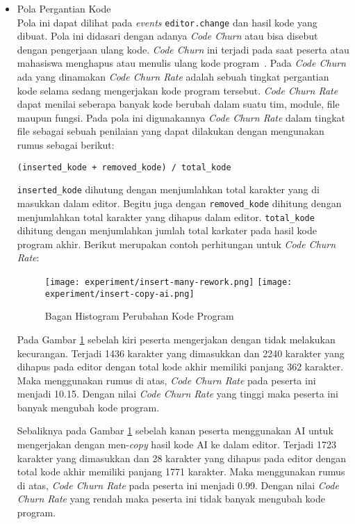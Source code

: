 \begin{itemize}
    \item Pola Pergantian Kode \\
    Pola ini dapat dilihat pada \textit{events} \verb|editor.change| dan hasil kode yang dibuat. Pola ini didasari dengan adanya \textit{Code Churn} atau bisa disebut dengan pengerjaan ulang kode. \textit{Code Churn} ini terjadi pada saat peserta atau mahasiswa menghapus atau menulis ulang kode program~\cite{hatica:churn}. Pada \textit{Code Churn} ada yang dinamakan \textit{Code Churn Rate} adalah sebuah tingkat pergantian kode selama sedang mengerjakan kode program tersebut. \textit{Code Churn Rate} dapat menilai seberapa banyak kode berubah dalam suatu tim, module, file maupun fungsi. Pada pola ini digunakannya \textit{Code Churn Rate} dalam tingkat file sebagai sebuah penilaian yang dapat dilakukan dengan mengunakan rumus sebagai berikut:
    
    \begin{center}
        \verb|(inserted_kode + removed_kode) / total_kode|
    \end{center}

    \verb|inserted_kode| dihutung dengan menjumlahkan total karakter yang di masukkan dalam editor. Begitu juga dengan \verb|removed_kode| dihitung dengan menjumlahkan total karakter yang dihapus dalam editor. \verb|total_kode| dihitung dengan menjumlahkan jumlah total karkater pada hasil kode program akhir. Berikut merupakan contoh perhitungan untuk \textit{Code Churn Rate}:

    \begin{figure}[H]
        \centering
        \texttt{[image: experiment/insert-many-rework.png]}
        \texttt{[image: experiment/insert-copy-ai.png]}
        \caption{Bagan Histogram Perubahan Kode Program}
        \label{fig:5:2:3:rework}
    \end{figure}

    Pada Gambar \ref{fig:5:2:3:rework} sebelah kiri peserta mengerjakan dengan tidak melakukan kecurangan. Terjadi 1436 karakter yang dimasukkan dan 2240 karakter yang dihapus pada editor dengan total kode akhir memiliki panjang 362 karakter. Maka menggunakan rumus di atas, \textit{Code Churn Rate} pada peserta ini menjadi 10.15. Dengan nilai \textit{Code Churn Rate} yang tinggi maka peserta ini banyak mengubah kode program.
    
    Sebaliknya pada Gambar \ref{fig:5:2:3:rework} sebelah kanan peserta menggunakan AI untuk mengerjakan dengan men-\textit{copy} hasil kode AI ke dalam editor. Terjadi 1723 karakter yang dimasukkan dan 28 karakter yang dihapus pada editor dengan total kode akhir memiliki panjang 1771 karakter. Maka menggunakan rumus di atas, \textit{Code Churn Rate} pada peserta ini menjadi 0.99. Dengan nilai \textit{Code Churn Rate} yang rendah maka peserta ini tidak banyak mengubah kode program.


\end{itemize}
